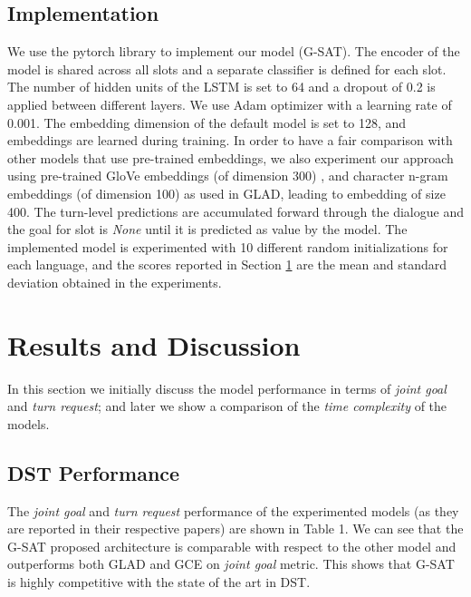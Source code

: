 \documentclass{article}
\begin{document}
\subsection{Implementation}
We use the pytorch \cite{Paszke2017AutomaticDI} library to implement our model (G-SAT).
The encoder of the model is shared across all slots and a separate classifier is defined for each slot.
The number of hidden units of the LSTM is set to 64 and a dropout of 0.2 is applied between different layers.
We use Adam optimizer with a learning rate of 0.001.
The embedding dimension of the default model is set to 128, and embeddings are learned during training.
In order to have a fair comparison with other models that use pre-trained embeddings, we also experiment our approach using pre-trained GloVe embeddings (of dimension 300) \cite{glove}, and character n-gram embeddings (of dimension 100) \cite{hashimoto} as used in GLAD, leading to embedding of size 400.
The turn-level predictions are accumulated forward through the dialogue and the goal for slot  is \textit{None} until it is predicted as value  by the model.
The implemented model is experimented with 10 different random initializations for each language, and the scores reported in Section \ref{sec:results} are the mean and standard deviation obtained in the experiments.

\section{Results and Discussion}
\label{sec:results}
In this section we initially discuss  the model performance in terms of \textit{joint goal} and \textit{turn request}; and later we show a comparison of the \textit{time complexity} of the models.

\subsection{DST Performance}
The \textit{joint goal} and \textit{turn request} performance of the experimented models (as they are reported in their respective papers) are shown in Table 1. We can see that the G-SAT proposed architecture is comparable with respect to  the other model and outperforms both GLAD and GCE on \textit{joint goal} metric. This shows that G-SAT is highly competitive with the state of the art in DST.
\end{document}
